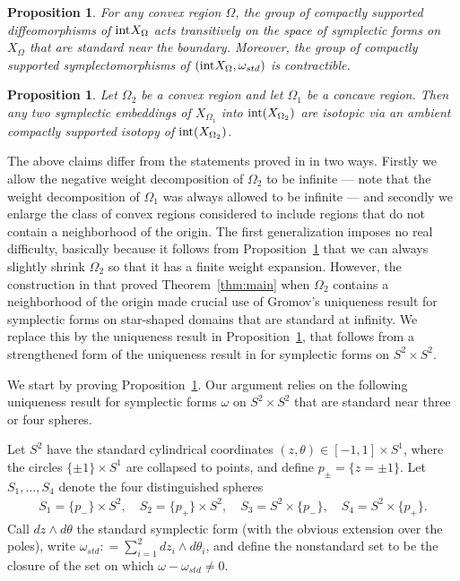 \documentclass[11pt, reqno]{amsart}
\newtheorem{prop}[thm]{Proposition}
\theoremstyle{remark}
\numberwithin{equation}{subsection}
\numberwithin{figure}{section}
\theoremstyle{customremark}
\newcommand{\intt}{{\rm int}}
\newcommand{\Om}{{\Omega}}
\newcommand{\om}{{\omega}}
\begin{document}
\begin{prop} 
\label{prop:uniq} For any convex region $\Om$, the group of compactly supported diffeomorphisms of $\intt X_\Om$ acts transitively on
the space of symplectic forms on $X_\Om$ that are standard near the boundary. Moreover, 
the group of compactly supported symplectomorphisms of $(\intt X_\Om, \om_{std})$
 is contractible. 
\end{prop}



\begin{prop}
\label{prop:conn}
Let $\Omega_2$ be a convex region and let $\Omega_1$ be a concave region.  Then any two symplectic embeddings of $X_{\Omega_1}$ into $\intt(X_{\Omega_2})$ are isotopic via an ambient compactly supported isotopy of $\intt(X_{\Omega_2})$.
\end{prop}



The above claims  differ from the statements proved in \cite{CG} in two ways. Firstly we allow the negative weight decomposition of $\Om_2$ to be infinite --- note that the weight decomposition  of $\Om_1$ was always allowed to be infinite --- and secondly we enlarge the class of convex regions considered to include regions that do not contain a neighborhood of the origin.  
The first generalization imposes no real difficulty, basically because it follows from Proposition~\ref{prop:conn} that we can always slightly shrink $\Om_2$ so that it has a finite weight expansion.   However, the construction in \cite{CG} that proved Theorem~\ref{thm:main} when $\Om_2$ contains a neighborhood of the origin made crucial
use of Gromov's uniqueness result for symplectic forms on star-shaped domains that are standard at infinity. 
We replace this by the uniqueness result in Proposition~\ref{prop:uniq}, that follows from
a strengthened form of the uniqueness result in \cite[Thm.9.4.7]{JHOL} for symplectic forms on $S^2\times S^2$.







We start by proving Proposition~\ref{prop:uniq}.  
Our argument relies on the following uniqueness result
for symplectic forms $\om$ on $S^2 \times S^2$ that are standard near three or four spheres.  


Let $S^2$ have the standard cylindrical coordinates $(z,\theta)\in [-1,1]\times S^1$, where the circles $\{\pm 1\}\times S^1$ are collapsed to points, and define $p_\pm = \lbrace z = \pm 1 \rbrace$.
Let $S_1, \ldots, S_4$ denote the four distinguished spheres 
\begin{align}\label{eq:S1234}
S_1 = \lbrace p_- \rbrace \times S^2, \quad S_2 = \lbrace p_+ \rbrace \times S^2, \quad S_3 = S^2 \times \lbrace p_- \rbrace, \quad  S_4 = S^2 \times \lbrace p_+ \rbrace.
\end{align} 
Call $dz \wedge d \theta$ the standard symplectic form (with the obvious extension over the poles), write $\om_{std}: = \sum^2_{i=1} dz_i \wedge d\theta_i$, and define the nonstandard set to be the closure of the set on which  $\om-\om_{std} \ne 0$.
\end{document}
